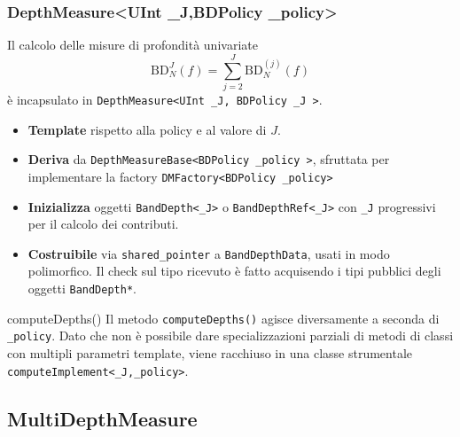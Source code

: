 \documentclass[9pt]{beamer}
\begin{document}
\begin{frame}
\frametitle{\ttfamily DepthMeasure<UInt \_J,BDPolicy \_policy>}
 Il calcolo delle misure di profondità univariate 
\[
\text{BD}^J_N\left( f \right) = \sum_{j=2}^J \text{BD}^{(j)}_N\left(f\right)
\]
\`e incapsulato in \texttt{DepthMeasure<UInt \_J, BDPolicy \_J >}.\\

\begin{itemize}
 \item \textbf{Template} rispetto alla policy e al valore di $J$.
 \item \textbf{Deriva} da \texttt{DepthMeasureBase<BDPolicy \_policy >}, sfruttata per implementare la factory \texttt{DMFactory<BDPolicy \_policy>}
 \item \textbf{Inizializza} oggetti \texttt{BandDepth<\_J>} o \texttt{BandDepthRef<\_J>} con \texttt{\_J} progressivi per il calcolo dei contributi.
 \item \textbf{Costruibile} via \texttt{shared\_pointer} a \texttt{BandDepthData}, usati in modo polimorfico. Il check sul tipo ricevuto \`e fatto acquisendo i tipi pubblici degli oggetti \texttt{BandDepth*}.
\end{itemize}
\begin{block}{\ttfamily computeDepths()}
 Il metodo \texttt{computeDepths()} agisce diversamente a seconda di \texttt{\_policy}. Dato che non \`e possibile dare specializzazioni parziali di metodi di classi con multipli parametri template,
viene racchiuso in una classe strumentale \texttt{computeImplement<\_J,\_policy>}.
\end{block}

\end{frame}



\subsection{MultiDepthMeasure}

\end{document}
